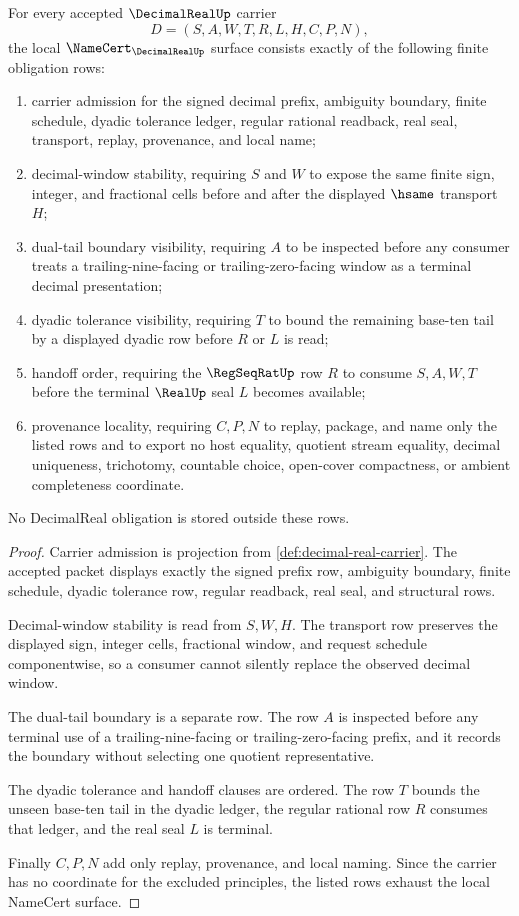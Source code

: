 \begin{theorem}
\label{thm:decimal-real-namecert-obligations}
For every accepted $\DecimalRealUp$ carrier
$$
D=(S,A,W,T,R,L,H,C,P,N),
$$
the local $\NameCert_{\DecimalRealUp}$ surface consists exactly of the following finite obligation rows:
\begin{enumerate}
\item carrier admission for the signed decimal prefix, ambiguity boundary, finite schedule, dyadic tolerance ledger, regular rational readback, real seal, transport, replay, provenance, and local name;
\item decimal-window stability, requiring $S$ and $W$ to expose the same finite sign, integer, and fractional cells before and after the displayed $\hsame$ transport $H$;
\item dual-tail boundary visibility, requiring $A$ to be inspected before any consumer treats a trailing-nine-facing or trailing-zero-facing window as a terminal decimal presentation;
\item dyadic tolerance visibility, requiring $T$ to bound the remaining base-ten tail by a displayed dyadic row before $R$ or $L$ is read;
\item handoff order, requiring the $\RegSeqRatUp$ row $R$ to consume $S,A,W,T$ before the terminal $\RealUp$ seal $L$ becomes available;
\item provenance locality, requiring $C,P,N$ to replay, package, and name only the listed rows and to export no host equality, quotient stream equality, decimal uniqueness, trichotomy, countable choice, open-cover compactness, or ambient completeness coordinate.
\end{enumerate}
No DecimalReal obligation is stored outside these rows.
\end{theorem}
\begin{proof}
Carrier admission is projection from \autoref{def:decimal-real-carrier}. The accepted packet displays exactly the signed prefix row, ambiguity boundary, finite schedule, dyadic tolerance row, regular readback, real seal, and structural rows.

Decimal-window stability is read from $S,W,H$. The transport row preserves the displayed sign, integer cells, fractional window, and request schedule componentwise, so a consumer cannot silently replace the observed decimal window.

The dual-tail boundary is a separate row. The row $A$ is inspected before any terminal use of a trailing-nine-facing or trailing-zero-facing prefix, and it records the boundary without selecting one quotient representative.

The dyadic tolerance and handoff clauses are ordered. The row $T$ bounds the unseen base-ten tail in the dyadic ledger, the regular rational row $R$ consumes that ledger, and the real seal $L$ is terminal.

Finally $C,P,N$ add only replay, provenance, and local naming. Since the carrier has no coordinate for the excluded principles, the listed rows exhaust the local NameCert surface.
\end{proof}

